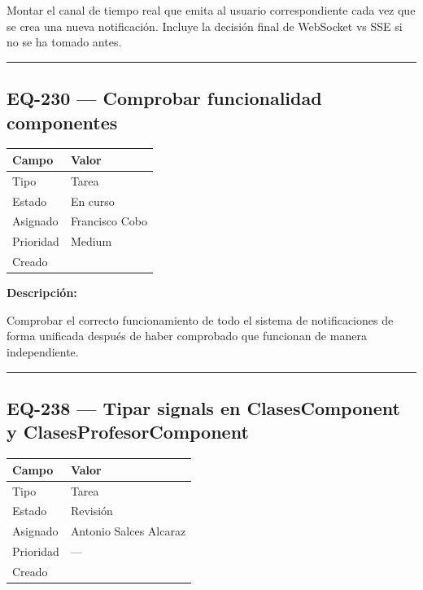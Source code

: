 \documentclass[
  spanish,
  11pt,
]{report}
\newcounter{none} %
\begin{document}
Montar el canal de tiempo real que emita al usuario correspondiente cada
vez que se crea una nueva notificación. Incluye la decisión final de
WebSocket vs SSE si no se ha tomado antes.

\begin{center}\rule{0.5\linewidth}{0.5pt}\end{center}

\subsection{EQ-230 --- Comprobar funcionalidad
componentes}\label{eq-230-comprobar-funcionalidad-componentes}

{\def\LTcaptype{none} %
\begin{longtable}[]{@{}ll@{}}
\toprule\noalign{}
Campo & Valor \\
\midrule\noalign{}
\endhead
\bottomrule\noalign{}
\endlastfoot
Tipo & Tarea \\
Estado & En curso \\
Asignado & Francisco Cobo \\
Prioridad & Medium \\
Creado & \\
\end{longtable}
}

\textbf{Descripción:}

Comprobar el correcto funcionamiento de todo el sistema de
notificaciones de forma unificada después de haber comprobado que
funcionan de manera independiente.

\begin{center}\rule{0.5\linewidth}{0.5pt}\end{center}

\subsection{EQ-238 --- Tipar signals en ClasesComponent y
ClasesProfesorComponent}\label{eq-238-tipar-signals-en-clasescomponent-y-clasesprofesorcomponent}

{\def\LTcaptype{none} %
\begin{longtable}[]{@{}ll@{}}
\toprule\noalign{}
Campo & Valor \\
\midrule\noalign{}
\endhead
\bottomrule\noalign{}
\endlastfoot
Tipo & Tarea \\
Estado & Revisión \\
Asignado & Antonio Salces Alcaraz \\
Prioridad & --- \\
Creado & \\
\end{longtable}
}
\end{document}
